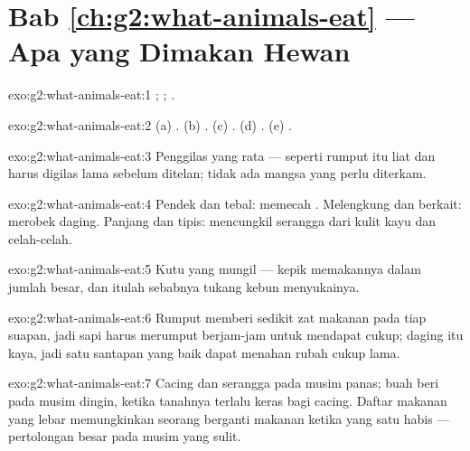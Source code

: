 \section*{Bab \ref{ch:g2:what-animals-eat} --- Apa yang Dimakan Hewan}

\begin{solution}{exo:g2:what-animals-eat:1}
; ; .
\end{solution}

\begin{solution}{exo:g2:what-animals-eat:2}
(a) . (b) . (c) . (d) . (e)
.
\end{solution}

\begin{solution}{exo:g2:what-animals-eat:3}
Penggilas yang rata ---  seperti rumput itu liat dan harus
digilas lama sebelum ditelan; tidak ada mangsa yang perlu diterkam.
\end{solution}

\begin{solution}{exo:g2:what-animals-eat:4}
Pendek dan tebal: memecah . Melengkung dan berkait: merobek
daging. Panjang dan tipis: mencungkil serangga dari kulit kayu dan
celah-celah.
\end{solution}

\begin{solution}{exo:g2:what-animals-eat:5}
Kutu  yang mungil --- kepik memakannya dalam jumlah besar, dan
itulah sebabnya tukang kebun menyukainya.
\end{solution}

\begin{solution}{exo:g2:what-animals-eat:6}
Rumput memberi sedikit zat makanan pada tiap suapan, jadi sapi harus
merumput berjam-jam untuk mendapat cukup; daging itu kaya, jadi satu
santapan yang baik dapat menahan rubah cukup lama.
\end{solution}

\begin{solution}{exo:g2:what-animals-eat:7}
Cacing dan serangga pada musim panas; buah beri pada musim dingin,
ketika tanahnya terlalu keras bagi cacing. Daftar makanan yang lebar
memungkinkan seorang  berganti makanan ketika yang satu habis
--- pertolongan besar pada musim yang sulit.
\end{solution}

